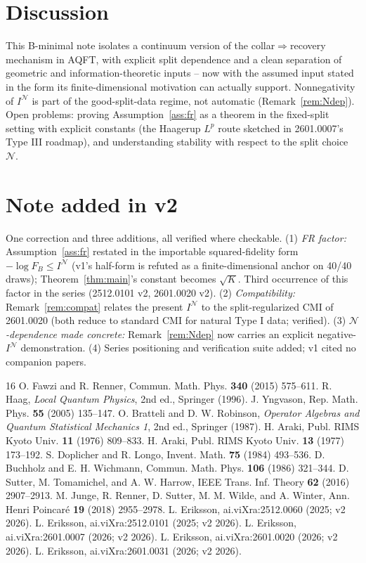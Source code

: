 \documentclass[11pt]{article}
\theoremstyle{remark}
\begin{document}
\section{Discussion}
This B-minimal note isolates a continuum version of the
collar$\Rightarrow$recovery mechanism in AQFT, with explicit split
dependence and a clean separation of geometric and information-theoretic
inputs -- now with the assumed input stated in the form its
finite-dimensional motivation can actually support. Nonnegativity of $I^{\mathcal{N}}$ is part of the
good-split-data regime, not automatic (Remark~\ref{rem:Ndep}). Open
problems: proving Assumption~\ref{ass:fr} as a theorem in the fixed-split
setting with explicit constants (the Haagerup $L^p$ route sketched in 2601.0007's
Type III roadmap), and understanding stability with respect to the split
choice $\mathcal{N}$.

\section*{Note added in v2}
One correction and three additions, all verified where checkable. (1)
\emph{FR factor:} Assumption~\ref{ass:fr} restated in the importable
squared-fidelity form $-\log F_B \le I^{\mathcal{N}}$ (v1's half-form is
refuted as a finite-dimensional anchor on 40/40 draws);
Theorem~\ref{thm:main}'s constant becomes $\sqrt{K}$. Third occurrence of
this factor in the series (2512.0101 v2, 2601.0020 v2). (2)
\emph{Compatibility:} Remark~\ref{rem:compat} relates the present
$I^{\mathcal{N}}$ to the split-regularized CMI of 2601.0020 (both reduce
to standard CMI for natural Type I data; verified). (3)
\emph{$\mathcal{N}$-dependence made concrete:} Remark~\ref{rem:Ndep} now
carries an explicit negative-$I^{\mathcal{N}}$ demonstration. (4) Series
positioning and verification suite added; v1 cited no companion papers.

\begin{thebibliography}{16}
 O. Fawzi and R. Renner, Commun. Math. Phys. \textbf{340}
(2015) 575--611.
 R. Haag, \emph{Local Quantum Physics}, 2nd ed., Springer
(1996).
 J. Yngvason, Rep. Math. Phys. \textbf{55} (2005)
135--147.
 O. Bratteli and D. W. Robinson, \emph{Operator Algebras and
Quantum Statistical Mechanics 1}, 2nd ed., Springer (1987).
 H. Araki, Publ. RIMS Kyoto Univ. \textbf{11} (1976)
809--833.
 H. Araki, Publ. RIMS Kyoto Univ. \textbf{13} (1977)
173--192.
 S. Doplicher and R. Longo, Invent. Math. \textbf{75} (1984)
493--536.
 D. Buchholz and E. H. Wichmann, Commun. Math. Phys.
\textbf{106} (1986) 321--344.
 D. Sutter, M. Tomamichel, and A. W. Harrow, IEEE Trans.
Inf. Theory \textbf{62} (2016) 2907--2913.
 M. Junge, R. Renner, D. Sutter, M. M. Wilde, and A.
Winter, Ann. Henri Poincar\'e \textbf{19} (2018) 2955--2978.
 L. Eriksson, ai.viXra:2512.0060 (2025; v2 2026).
 L. Eriksson, ai.viXra:2512.0101 (2025; v2 2026).
 L. Eriksson, ai.viXra:2601.0007 (2026; v2 2026).
 L. Eriksson, ai.viXra:2601.0020 (2026; v2 2026).
 L. Eriksson, ai.viXra:2601.0031 (2026; v2 2026).
\end{thebibliography}
\end{document}
